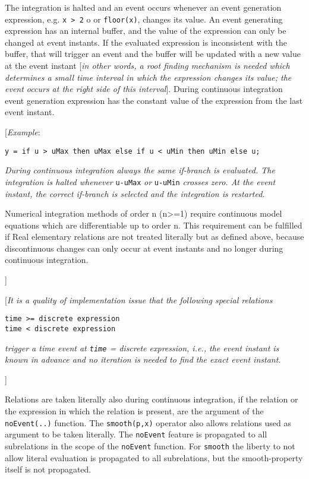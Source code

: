 The integration is halted and an event occurs whenever an event
generation expression, e.g. \lstinline!x > 2! o or \lstinline!floor(x)!, changes
its value. An event generating expression has an internal buffer, and
the value of the expression can only be changed at event instants. If
the evaluated expression is inconsistent with the buffer, that will
trigger an event and the buffer will be updated with a new value at the
event instant {[}\emph{in other words, a root finding mechanism is
needed which determines a small time interval in which the expression
changes its value; the event occurs at the right side of this
interval}{]}. During continuous integration event generation expression
has the constant value of the expression from the last event instant.

{[}\emph{Example}:
\begin{lstlisting}[language=modelica]
y = if u > uMax then uMax else if u < uMin then uMin else u;
\end{lstlisting}

\emph{During continuous integration always the same if-branch is
evaluated. The integration is halted whenever} \lstinline!u-uMax! \emph{or} \lstinline!u-uMin!
\emph{crosses zero. At the event instant, the correct if-branch is
selected and the integration is restarted.}

Numerical integration methods of order n (n\textgreater{}=1) require
continuous model equations which are differentiable up to order n. This
requirement can be fulfilled if Real elementary relations are not
treated literally but as defined above, because discontinuous changes
can only occur at event instants and no longer during continuous
integration.

{]}

{[}\emph{It is a quality of implementation issue that the following
special relations}
\begin{lstlisting}[language=modelica]
time >= discrete expression
time < discrete expression
\end{lstlisting}

\emph{trigger a time event at \lstinline!time! = \emph{discrete expression}, i.e., the
event instant is known in advance and no iteration is needed to find the
exact event instant.}

{]}

Relations are taken literally also during continuous integration, if the
relation or the expression in which the relation is present, are the
argument of the \lstinline!noEvent(..)! function. The \lstinline!smooth(p,x)! operator also
allows relations used as argument to be taken literally. The \lstinline!noEvent!
feature is propagated to all subrelations in the scope of the \lstinline!noEvent!
function. For \lstinline!smooth! the liberty to not allow literal evaluation is
propagated to all subrelations, but the smooth-property itself is not
propagated.

